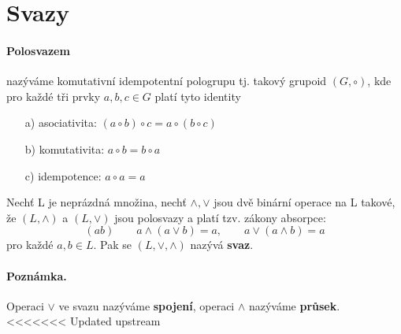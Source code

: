 \section{Svazy}

\paragraph{Polosvazem} nazýváme komutativní idempotentní pologrupu tj. takový grupoid $(G, \circ)$, kde pro každé tři prvky $a,b,c \in G$ platí tyto identity  
\begin{itemize}
	\item[a)] asociativita: $(a \circ b) \circ c = a \circ (b \circ c)$
	\item[b)] komutativita: $a \circ b = b \circ a$
	\item[c)] idempotence: $a \circ a = a$
\end{itemize}

\begin{definition}
	Nechť L je neprázdná množina, nechť $\wedge, \vee$ jsou dvě binární operace na L takové, že $(L, \wedge)$ a $(L, \vee)$ jsou polosvazy a platí tzv. zákony absorpce:
	$$(ab) \qquad a \wedge (a \vee b) = a, \qquad a \vee (a \wedge b) = a$$
	pro každé $a,b \in L$. Pak se $(L, \vee, \wedge)$ nazývá \textbf{svaz}.
\end{definition}

\paragraph{Poznámka.} Operaci $\vee$ ve svazu nazýváme \textbf{spojení}, operaci $\wedge$ nazýváme \textbf{průsek}.
<<<<<<< Updated upstream
\begin{definition}\end{definition}
\begin{definition}\end{definition}
\begin{definition}\end{definition}
\begin{definition}\end{definition}
\begin{definition}\end{definition}
\begin{definition}\end{definition}
\begin{definition}\end{definition}
\begin{definition}\end{definition}
\begin{definition}\end{definition}


